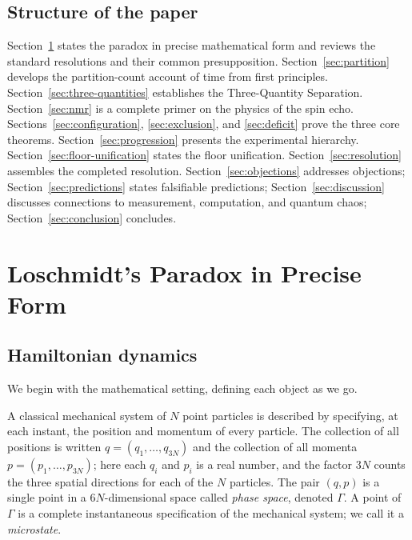 \documentclass[11pt,a4paper]{article}
\theoremstyle{thmstyle}
\theoremstyle{definition}
\theoremstyle{remark}
\begin{document}
\subsection{Structure of the paper}
\label{sec:structure}

Section~\ref{sec:loschmidt-precise} states the paradox in precise
mathematical form and reviews the standard resolutions and their common
presupposition. Section~\ref{sec:partition} develops the partition-count
account of time from first principles.
Section~\ref{sec:three-quantities} establishes the Three-Quantity
Separation. Section~\ref{sec:nmr} is a complete primer on the physics of
the spin echo. Sections~\ref{sec:configuration}, \ref{sec:exclusion},
and \ref{sec:deficit} prove the three core theorems.
Section~\ref{sec:progression} presents the experimental hierarchy.
Section~\ref{sec:floor-unification} states the floor unification.
Section~\ref{sec:resolution} assembles the completed resolution.
Section~\ref{sec:objections} addresses objections;
Section~\ref{sec:predictions} states falsifiable predictions;
Section~\ref{sec:discussion} discusses connections to measurement,
computation, and quantum chaos; Section~\ref{sec:conclusion} concludes.

\section{Loschmidt's Paradox in Precise Form}
\label{sec:loschmidt-precise}

\subsection{Hamiltonian dynamics}
\label{sec:hamiltonian}

We begin with the mathematical setting, defining each object as we go.

A classical mechanical system of $N$ point particles is described by
specifying, at each instant, the position and momentum of every
particle. The collection of all positions is written
$q=(q_{1},\dots,q_{3N})$ and the collection of all momenta
$p=(p_{1},\dots,p_{3N})$; here each $q_{i}$ and $p_{i}$ is a real number,
and the factor $3N$ counts the three spatial directions for each of the
$N$ particles. The pair $(q,p)$ is a single point in a $6N$-dimensional
space called \emph{phase space}, denoted $\Gamma$. A point of $\Gamma$
is a complete instantaneous specification of the mechanical system; we
call it a \emph{microstate}.
\end{document}
